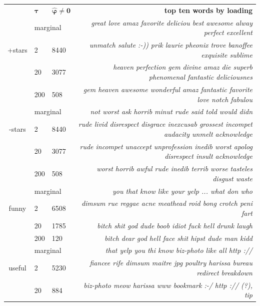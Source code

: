 \documentclass[12pt]{article}
\newcommand{\bs}[1]{\boldsymbol{#1}}
\begin{document}
\begin{table}[b!]
\footnotesize{}
\hspace{-.4cm}
\begin{tabular}{cll|r}
& \small $\bs{\tau}$ & \small $\bs{\hat\varphi \neq 0}$ 
& \small {\bf top ten words by loading}\\
\noalign{\smallskip}
\hline
 & \multicolumn{2}{l|}{marginal}    & \footnotesize\it great love amaz favorite deliciou best awesome alway perfect excellent \\
\small +stars & 2 & 8440 & \footnotesize\it  unmatch salute :-)) prik laurie pheonix trove banoffee exquisite sublime \\
 & 20 & 3077 & \footnotesize\it  heaven perfection gem divine amaz die superb phenomenal fantastic deliciousnes \\
 & 200 & 508 & \footnotesize\it  gem heaven awesome wonderful amaz fantastic favorite love notch fabulou \\
\hline
 &  \multicolumn{2}{l|}{marginal}   & \footnotesize\it  not worst ask horrib minut rude said told would didn \\
\small -stars & 2 & 8440 & \footnotesize\it  rude livid disrespect disgrace inexcusab grossest incompet audacity unmelt acknowledge \\
 & 20 & 3077 & \footnotesize\it  rude incompet unaccept unprofession inedib worst apolog disrespect insult acknowledge \\
 & 200 & 508 & \footnotesize\it  worst horrib awful rude inedib terrib worse tasteles disgust waste \\
\hline
 & \multicolumn{2}{l|}{marginal}   & \footnotesize\it  you that know like your yelp ... what don who \\
\small funny & 2 & 6508 & \footnotesize\it  dimsum rue reggae acne meathead roid bong crotch peni fart \\
 & 20 & 1785 & \footnotesize\it  bitch shit god dude boob idiot fuck hell drunk laugh \\
 & 200 & 120 & \footnotesize\it  bitch dear god hell face shit hipst dude man kidd \\
\hline
 &  \multicolumn{2}{l|}{marginal}   & \footnotesize\it  that yelp you thi know biz-photo like all http :// \\
\small useful & 2 & 5230 & \footnotesize\it  fiancee rife dimsum maitre jpg poultry harissa bureau redirect breakdown \\
 & 20 & 884 & \footnotesize\it  biz-photo meow harissa www bookmark :-/ http :// (?), tip \\

\end{tabular}
\end{table}
\end{document}
